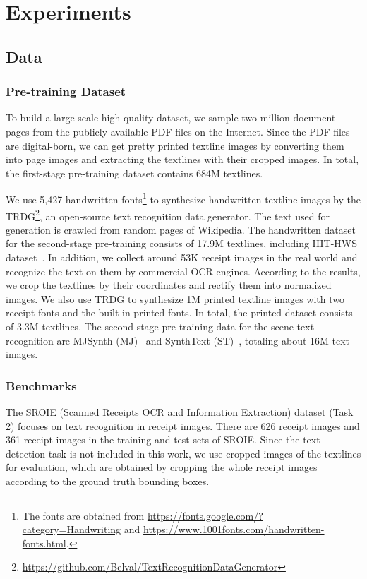 \documentclass[letterpaper]{article} \usepackage{aaai23}  \usepackage{times}  \usepackage{helvet}  \usepackage{courier}  \usepackage[hyphens]{url}  \usepackage{graphicx} \urlstyle{rm} \def\UrlFont{\rm}  \usepackage{natbib}  \usepackage{caption} \frenchspacing  \setlength{\pdfpagewidth}{8.5in} \setlength{\pdfpageheight}{11in} \usepackage{algorithm}
\begin{document}
\section{Experiments}


\subsection{Data}


\subsubsection{Pre-training Dataset}

To build a large-scale high-quality dataset, we sample two million document pages from the publicly available PDF files on the Internet. Since the PDF files are digital-born, we can get pretty printed textline images by converting them into page images and extracting the textlines with their cropped images.
In total, the first-stage pre-training dataset contains 684M textlines.




We use 5,427 handwritten fonts\footnote{\tiny The fonts are obtained from \url{https://fonts.google.com/?category=Handwriting} and \url{https://www.1001fonts.com/handwritten-fonts.html}.} to synthesize handwritten textline images by the TRDG\footnote{\tiny\url{https://github.com/Belval/TextRecognitionDataGenerator}}, an open-source text recognition data generator. The text used for generation is crawled from random pages of Wikipedia. The handwritten dataset for the second-stage pre-training consists of 17.9M textlines, including IIIT-HWS dataset~\cite{krishnan2016generating}.
In addition, we collect around 53K receipt images in the real world and recognize the text on them by commercial OCR engines. According to the results, we crop the textlines by their coordinates and rectify them into normalized images.
We also use TRDG to synthesize 1M printed textline images with two receipt fonts and the built-in printed fonts. In total, the printed dataset consists of 3.3M textlines.
The second-stage pre-training data for the scene text recognition are MJSynth (MJ)~\cite{synth90ka} and SynthText (ST)~\cite{gupta2016synthetic}, totaling about 16M text images.

\subsubsection{Benchmarks}
The SROIE (Scanned Receipts OCR and Information Extraction) dataset (Task 2) focuses on text recognition in receipt images.
There are 626 receipt images and 361 receipt images in the training and test sets of SROIE.
Since the text detection task is not included in this work, we use cropped images of the textlines for evaluation, which are obtained by cropping the whole receipt images according to the ground truth bounding boxes.
\end{document}
